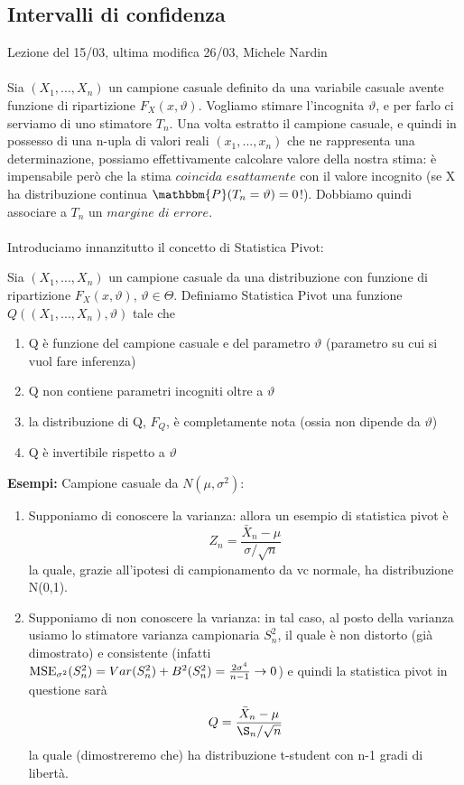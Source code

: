 
\subsection{Intervalli di confidenza}
Lezione del 15/03, ultima modifica 26/03, Michele Nardin
\\ \\
Sia $(X_1,...,X_n)$ un campione casuale definito da una variabile casuale avente funzione di ripartizione $F_X(x,\vartheta)$. Vogliamo stimare l'incognita $\vartheta$, e per farlo ci serviamo di uno stimatore $T_n$.
Una volta estratto il campione casuale, e quindi in possesso di una n-upla di valori reali $(x_1,...,x_n)$ che ne rappresenta una determinazione, possiamo effettivamente calcolare valore della nostra stima: è impensabile però che la stima $coincida$ $esattamente$ con il valore incognito (se X ha distribuzione continua $\mathbbm{P}(T_n=\vartheta)=0$!). Dobbiamo quindi associare a $T_n$ un $margine$ $di$ $errore$.
\\ \\
Introduciamo innanzitutto il concetto di Statistica Pivot:
\begin{definizione}
Sia $(X_1,...,X_n)$ un campione casuale da una distribuzione con funzione di ripartizione $F_X (x,\vartheta)$, $\vartheta \in \Theta$. 
Definiamo Statistica Pivot una funzione $Q((X_1,...,X_n),\vartheta)$ tale che
\begin{enumerate}
\item Q è funzione del campione casuale e del parametro $\vartheta$ (parametro su cui si vuol fare inferenza)
\item Q non contiene parametri incogniti oltre a $\vartheta$
\item la distribuzione di Q, $F_Q$, è completamente nota (ossia non dipende da $\vartheta$)
\item Q è invertibile rispetto a $\vartheta$
\end{enumerate}
\end{definizione}

\noindent\textbf{Esempi:}
Campione casuale da $N(\mu,\sigma^2)$:
\begin{enumerate}
\item Supponiamo di conoscere la varianza: allora un esempio di statistica pivot è $$Z_n=\frac{\bar{X}_n - \mu}{\sigma / \sqrt{n}} $$ la quale, grazie all'ipotesi di campionamento da vc normale, ha distribuzione N(0,1).
\item Supponiamo di non conoscere la varianza: in tal caso, al posto della varianza usiamo lo stimatore varianza campionaria $S_n^2$, il quale è non distorto (già dimostrato) e consistente (infatti $\operatorname{MSE}_{\sigma^2}(S_n^2)=Var(S_n^2) + B^2(S_n^2)=\frac{2\sigma^4}{n-1} \rightarrow 0$) e quindi la statistica pivot in questione sarà $$Q=\frac{\bar{X}_n - \mu}{\S_n / \sqrt{n}}$$ la quale (dimostreremo che) ha distribuzione t-student con n-1 gradi di libertà.
\end{enumerate}


